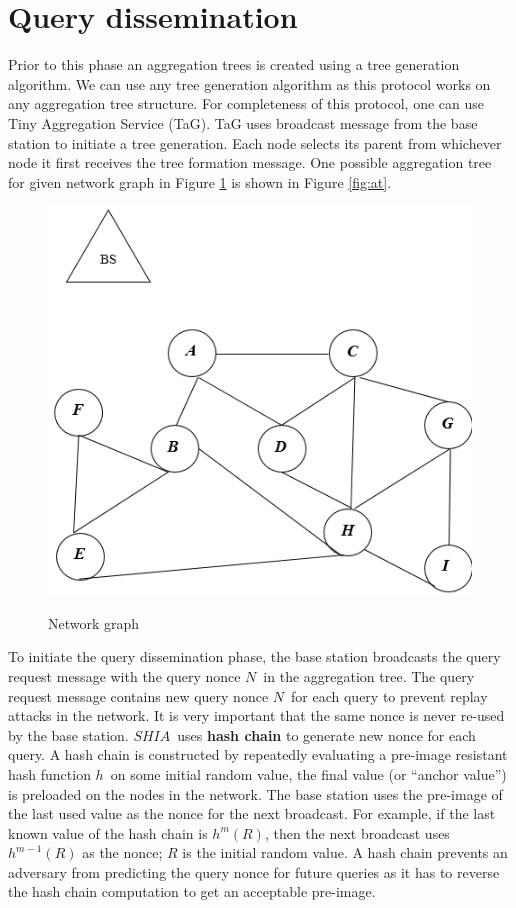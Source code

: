	\section{Query dissemination}
		Prior to this phase an aggregation trees is created using a tree generation algorithm.
		We can use any tree generation algorithm as this protocol works on any aggregation tree structure.
		For completeness of this protocol, one can use Tiny Aggregation Service (TaG)\cite{madden2002tag}.
		TaG uses broadcast message from the base station to initiate a tree generation.
		Each node selects its parent from whichever node it first receives the tree formation message.
		One possible aggregation tree for given network graph in Figure \ref{fig:ng} is shown in Figure \ref{fig:at}. 
		\begin{figure}[hp]
			\centering
			\includegraphics[scale = 1]{images/network-graph.png}\\
			\caption{Network graph}
			\label{fig:ng}
		\end{figure}
		
		To initiate the query dissemination phase, the base station broadcasts the query request message with the query nonce $N$\ in the aggregation tree. 
		The query request message contains new query nonce $N$\ for each query to prevent replay attacks in the network.
		It is very important that the same nonce is never re-used by the base station.
		$SHIA$\ uses \textbf{hash chain} to generate new nonce for each query. 
		A hash chain is constructed by repeatedly evaluating a pre-image resistant hash function $h$\ on some initial random value, the final value (or ``anchor value'') is preloaded on the nodes in the network.
		The base station uses the pre-image of the last used  value as the nonce for the next broadcast.
		For example, if the last known value of the hash chain is $h^m(R)$, then the next broadcast uses $h^{m-1}(R)$ as the nonce; $R$ is the initial random value.  
		A hash chain prevents an adversary from predicting the query nonce for future queries as it has to reverse the hash chain computation to get an acceptable pre-image.

